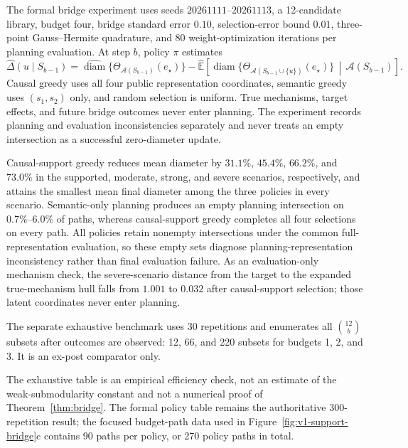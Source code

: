 \documentclass[11pt]{article}
\numberwithin{equation}{section}
\newcommand{\E}{\mathbb E}
\newcommand{\1}{\mathbf 1}
\newcommand{\cA}{\mathcal A}
\begin{document}
The formal bridge experiment uses seeds $20261111$--$20261113$, a 12-candidate library, budget four, bridge standard error $0.10$, selection-error bound $0.01$, three-point Gauss--Hermite quadrature, and 80 weight-optimization iterations per planning evaluation.  At step $b$, policy $\pi$ estimates
\begin{equation}
\label{eq:v1-app-bridge-value}
\widehat\Delta(u\mid S_{b-1})
=\widehat{\operatorname{diam}}\{\Theta_{\cA(S_{b-1})}(e_\star)\}
-\widehat{\E}\!\left[
\operatorname{diam}\{\Theta_{\cA(S_{b-1}\cup\{u\})}(e_\star)\}
\,\middle|\,\cA(S_{b-1})\right].
\end{equation}
Causal greedy uses all four public representation coordinates, semantic greedy uses $(s_1,s_2)$ only, and random selection is uniform.  True mechanisms, target effects, and future bridge outcomes never enter planning.  The experiment records planning and evaluation inconsistencies separately and never treats an empty intersection as a successful zero-diameter update.



Causal-support greedy reduces mean diameter by $31.1\%$, $45.4\%$, $66.2\%$, and $73.0\%$ in the supported, moderate, strong, and severe scenarios, respectively, and attains the smallest mean final diameter among the three policies in every scenario.  Semantic-only planning produces an empty planning intersection on $0.7\%$--$6.0\%$ of paths, whereas causal-support greedy completes all four selections on every path.  All policies retain nonempty intersections under the common full-representation evaluation, so these empty sets diagnose planning-representation inconsistency rather than final evaluation failure.  As an evaluation-only mechanism check, the severe-scenario distance from the target to the expanded true-mechanism hull falls from $1.001$ to $0.032$ after causal-support selection; those latent coordinates never enter planning.

The separate exhaustive benchmark uses 30 repetitions and enumerates all $\binom{12}{b}$ subsets after outcomes are observed: 12, 66, and 220 subsets for budgets 1, 2, and 3.  It is an ex-post comparator only.



The exhaustive table is an empirical efficiency check, not an estimate of the weak-submodularity constant and not a numerical proof of Theorem~\ref{thm:bridge}.  The formal policy table remains the authoritative 300-repetition result; the focused budget-path data used in Figure~\ref{fig:v1-support-bridge}c contains 90 paths per policy, or 270 policy paths in total.
\end{document}
